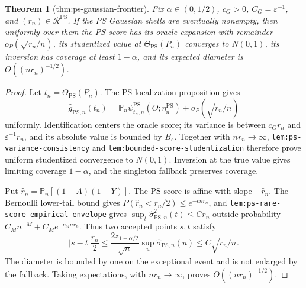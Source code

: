 \documentclass{article}
\newtheorem{theorem}{Theorem}
\begin{document}
\begin{theorem}[thm:ps-gaussian-frontier]\label{thm:ps-gaussian-frontier}
Fix \(\alpha\in(0,1/2)\), \(c_G>0\), \(C_G=\varepsilon^{-1}\), and \((r_n)\in\mathcal R^{\mathrm{PS}}\). If the PS Gaussian shells are eventually nonempty, then uniformly over them the PS score has its oracle expansion with remainder \(o_P(\sqrt{r_n/n})\), its studentized value at \(\Theta_{\mathrm{PS}}(P_n)\) converges to \(N(0,1)\), its inversion has coverage at least \(1-\alpha\), and its expected diameter is \(O((nr_n)^{-1/2})\).
\end{theorem}
\begin{proof}
Let \(t_n=\Theta_{\mathrm{PS}}(P_n)\). The PS localization proposition gives
\[\widehat g_{\mathrm{PS},n}(t_n)=\mathbb P_n\psi_{t_n,n}^{\mathrm{PS}}(O;\eta_n^{\mathrm{PS}})+o_P(\sqrt{r_n/n})\tag{1}\]
uniformly. Identification centers the oracle score; its variance is between \(c_Gr_n\) and \(\varepsilon^{-1}r_n\), and its absolute value is bounded by \(B_\varepsilon\). Together with \(nr_n\to\infty\), \texttt{lem:ps-variance-consistency} and \texttt{lem:bounded-score-studentization} therefore prove uniform studentized convergence to \(N(0,1)\). Inversion at the true value gives limiting coverage \(1-\alpha\), and the singleton fallback preserves coverage.

Put \(\widehat r_n=\mathbb P_n[(1-A)(1-Y)]\). The PS score is affine with slope \(-\widehat r_n\). The Bernoulli lower-tail bound gives \(P(\widehat r_n<r_n/2)\le e^{-cnr_n}\), and \texttt{lem:ps-rare-score-empirical-envelope} gives \(\sup_t\widehat\sigma_{\mathrm{PS},n}^2(t)\le Cr_n\) outside probability \(C_Mn^{-M}+C_Me^{-c_Mnr_n}\). Thus two accepted points \(s,t\) satisfy
\[|s-t|\frac{r_n}{2}\le\frac{2z_{1-\alpha/2}}{\sqrt n}\sup_u\widehat\sigma_{\mathrm{PS},n}(u)\le C\sqrt{r_n/n}.\]
The diameter is bounded by one on the exceptional event and is not enlarged by the fallback. Taking expectations, with \(nr_n\to\infty\), proves \(O((nr_n)^{-1/2})\).
\end{proof}
\end{document}
